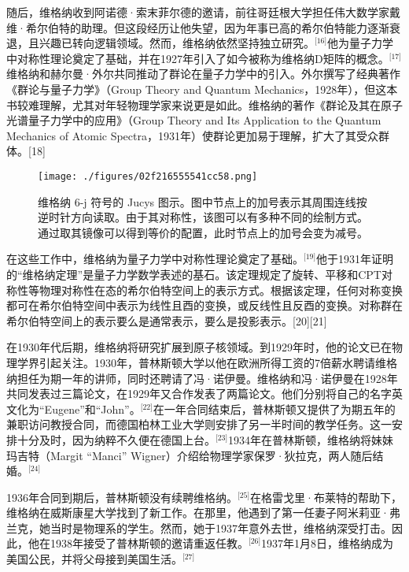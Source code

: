 随后，维格纳收到阿诺德·索末菲尔德的邀请，前往哥廷根大学担任伟大数学家戴维·希尔伯特的助理。但这段经历让他失望，因为年事已高的希尔伯特能力逐渐衰退，且兴趣已转向逻辑领域。然而，维格纳依然坚持独立研究。\(^\text{[16]}\)他为量子力学中对称性理论奠定了基础，并在1927年引入了如今被称为维格纳D矩阵的概念。\(^\text{[17]}\)维格纳和赫尔曼·外尔共同推动了群论在量子力学中的引入。外尔撰写了经典著作《群论与量子力学》（Group Theory and Quantum Mechanics，1928年），但这本书较难理解，尤其对年轻物理学家来说更是如此。维格纳的著作《群论及其在原子光谱量子力学中的应用》（Group Theory and Its Application to the Quantum Mechanics of Atomic Spectra，1931年）使群论更加易于理解，扩大了其受众群体。[18]
\begin{figure}[ht]
\centering
\texttt{[image: ./figures/02f216555541cc58.png]}
\caption{维格纳 6-j 符号的 Jucys 图示。图中节点上的加号表示其周围连线按逆时针方向读取。由于其对称性，该图可以有多种不同的绘制方式。通过取其镜像可以得到等价的配置，此时节点上的加号会变为减号。} \label{fig_YJwgn_2}
\end{figure}
在这些工作中，维格纳为量子力学中对称性理论奠定了基础。\(^\text{[19]}\)他于1931年证明的“维格纳定理”是量子力学数学表述的基石。该定理规定了旋转、平移和CPT对称性等物理对称性在态的希尔伯特空间上的表示方式。根据该定理，任何对称变换都可在希尔伯特空间中表示为线性且酉的变换，或反线性且反酉的变换。对称群在希尔伯特空间上的表示要么是通常表示，要么是投影表示。[20][21]

在1930年代后期，维格纳将研究扩展到原子核领域。到1929年时，他的论文已在物理学界引起关注。1930年，普林斯顿大学以他在欧洲所得工资的7倍薪水聘请维格纳担任为期一年的讲师，同时还聘请了冯·诺伊曼。维格纳和冯·诺伊曼在1928年共同发表过三篇论文，在1929年又合作发表了两篇论文。他们分别将自己的名字英文化为“Eugene”和“John”。\(^\text{[22]}\)在一年合同结束后，普林斯顿又提供了为期五年的兼职访问教授合同，而德国柏林工业大学则安排了另一半时间的教学任务。这一安排十分及时，因为纳粹不久便在德国上台。\(^\text{[23]}\)1934年在普林斯顿，维格纳将妹妹玛吉特（Margit “Manci” Wigner）介绍给物理学家保罗·狄拉克，两人随后结婚。\(^\text{[24]}\)

1936年合同到期后，普林斯顿没有续聘维格纳。\(^\text{[25]}\)在格雷戈里·布莱特的帮助下，维格纳在威斯康星大学找到了新工作。在那里，他遇到了第一任妻子阿米莉亚·弗兰克，她当时是物理系的学生。然而，她于1937年意外去世，维格纳深受打击。因此，他在1938年接受了普林斯顿的邀请重返任教。\(^\text{[26]}\)1937年1月8日，维格纳成为美国公民，并将父母接到美国生活。\(^\text{[27]}\)
